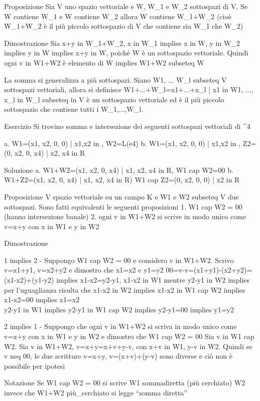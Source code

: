
Proposizione
	Sia V uno spazio vettoriale e W, W_1 e W_2 sottospazi di V.
	Se W contiene W_1 e W contiene W_2 allora W contiene W_1+W_2 (cioè W_1+W_2 è il più piccolo sottospazio di V che contiene sia W_1 che W_2)

Dimostrazione
	Sia x+y in W_1+W_2, x in W_1 implies x in W, y in W_2 implies y in W implies x+y in W, poiché W è un sottospazio vettoriale. Quindi ogni v in W1+W2 è elemento di W implies W1+W2 subseteq W

La somma si generalizza a più sottospazi. Siano W1, ... W_l subseteq V sottospazi vettoriali, allora si definisce W1+...+W_l={x1+...+x_l | x1 in W1, ..., x_l in W_l} subseteq in V è un sottospazio vettoriale ed è il più piccolo sottospazio che contiene tutti i W_1,...,W_l.

Esercizio
	Si trovino somma e intersezione dei seguenti sottospazi vettoriali di \R^4
	
		a. W1={(x1, x2, 0, 0) | x1,x2 in \R}, W2=L(e4)
		b. W1={(x1, x2, 0, 0) | x1,x2 in \R}, Z2={(0, x2, 0, x4) | x2, x4 in R}
	
Soluzione
	a. W1+W2={(x1, x2, 0, x4) | x1, x2, x4 in R}, W1 cap W2={00}
	b. W1+Z2={(x1, x2, 0, x4) | x1, x2, x4 in R)} W1 cap Z2={(0, x2, 0, 0) | x2 in R}

Proposizione
	V spazio vettoriale su un campo K e W1 e W2 subseteq V due sottospazi. Sono fatti equivalenti le seguenti proposizioni
	1. W1 cap W2 = {00} (hanno intersezione banale)
	2. ogni v in W1+W2 si scrive in modo unico come v=x+y con x in W1 e y in W2

Dimostrazione

	1 implies 2 - Suppongo W1 cap W2 = {00} e considero v in W1+W2. Scrivo v=x1+y1, v=x2+y2 e dimostro che x1=x2 e y1=y2
		00=v-v=(x1+y1)-(x2+y2)=(x1-x2)+(y1-y2) implies x1-x2=y2-y1, x1-x2 in W1 mentre y2-y1 in W2 implies per l'uguaglianza risulta che 
		x1-x2 in W2 implies x1-x2 in W1 cap W2 implies x1-x2=00 implies x1=x2\\ 
		y2-y1 in W1 implies y2-y1 in W1 cap W2 implies y2-y1=00 implies y1=y2
	
	2 implies 1 - Suppongo che ogni v in W1+W2 si scriva in modo unico come v=x+y con x in W1 e y in W2 e dimostro che W1 cap W2 = {00}
		Sia v in W1 cap W2. Sia v in W1+W2, v=x+y=x+v+y-v, con x+v in W1, y-v in W2. Quindi se v neq 00, le due scritture v=x+y, v=(x+v)+(y-v) sono diverse e ciò non è possibile per ipotesi
		
Notazione
	Se W1 cap W2 = {00} si scrive W1 sommadiretta (più cerchiato) W2 invece che W1+W2
	più_cerchiato si legge ``somma diretta''
	
